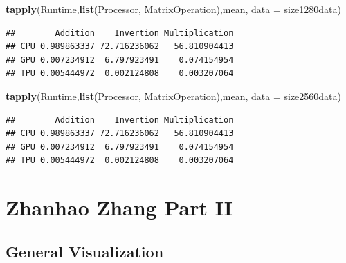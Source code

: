 \documentclass[
]{article}
\newenvironment{Shaded}{\begin{snugshade}}{\end{snugshade}}
\newcommand{\DataTypeTok}[1]{\textcolor[rgb]{0.13,0.29,0.53}{#1}}
\newcommand{\KeywordTok}[1]{\textcolor[rgb]{0.13,0.29,0.53}{\textbf{#1}}}
\newcommand{\NormalTok}[1]{#1}
\begin{document}
\begin{Shaded}
\begin{Highlighting}[]
\KeywordTok{tapply}\NormalTok{(Runtime,}\KeywordTok{list}\NormalTok{(Processor, MatrixOperation),mean, }\DataTypeTok{data =}\NormalTok{ size1280data)}
\end{Highlighting}
\end{Shaded}

\begin{verbatim}
##        Addition    Invertion Multiplication
## CPU 0.989863337 72.716236062   56.810904413
## GPU 0.007234912  6.797923491    0.074154954
## TPU 0.005444972  0.002124808    0.003207064
\end{verbatim}

\begin{Shaded}
\begin{Highlighting}[]
\KeywordTok{tapply}\NormalTok{(Runtime,}\KeywordTok{list}\NormalTok{(Processor, MatrixOperation),mean, }\DataTypeTok{data =}\NormalTok{ size2560data)}
\end{Highlighting}
\end{Shaded}

\begin{verbatim}
##        Addition    Invertion Multiplication
## CPU 0.989863337 72.716236062   56.810904413
## GPU 0.007234912  6.797923491    0.074154954
## TPU 0.005444972  0.002124808    0.003207064
\end{verbatim}

\hypertarget{zhanhao-zhang-part-ii}{%
\section{Zhanhao Zhang Part II}\label{zhanhao-zhang-part-ii}}

\hypertarget{general-visualization}{%
\subsection{General Visualization}\label{general-visualization}}
\end{document}

